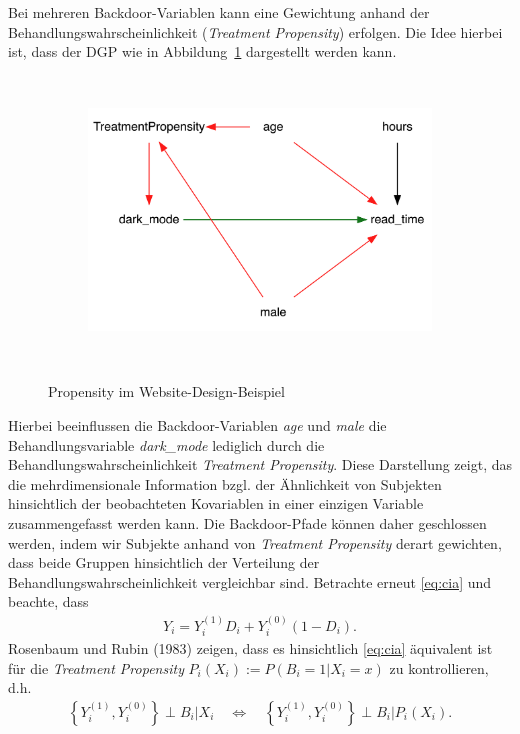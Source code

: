 \documentclass[
  a4paper,
  DIV=11,
  oneside]{scrreprt}
\begin{document}
Bei mehreren Backdoor-Variablen kann eine Gewichtung anhand der
Behandlungswahrscheinlichkeit (\emph{Treatment Propensity}) erfolgen.
Die Idee hierbei ist, dass der DGP wie in
Abbildung~\ref{fig-propCDdarkmode} dargestellt werden kann.

\begin{figure}

{\centering 

\begin{figure}[H]

{\centering \includegraphics[width=4in,height=3in]{Matching_files/figure-latex/dot-figure-2.png}

}

\end{figure}

}

\caption{\label{fig-propCDdarkmode}Propensity im
Website-Design-Beispiel}

\end{figure}

Hierbei beeinflussen die Backdoor-Variablen \emph{age} und \emph{male}
die Behandlungsvariable \emph{dark\_mode} lediglich durch die
Behandlungswahrscheinlichkeit \emph{Treatment Propensity}. Diese
Darstellung zeigt, das die mehrdimensionale Information bzgl. der
Ähnlichkeit von Subjekten hinsichtlich der beobachteten Kovariablen in
einer einzigen Variable zusammengefasst werden kann. Die Backdoor-Pfade
können daher geschlossen werden, indem wir Subjekte anhand von
\emph{Treatment Propensity} derart gewichten, dass beide Gruppen
hinsichtlich der Verteilung der Behandlungswahrscheinlichkeit
vergleichbar sind. Betrachte erneut \eqref{eq:cia} und beachte, dass
\begin{align}
  Y_i = Y_i^{(1)} D_i + Y_i^{(0)} (1-D_i).
\end{align} Rosenbaum und Rubin (1983) zeigen, dass es hinsichtlich
\eqref{eq:cia} äquivalent ist für die \emph{Treatment Propensity}
\(P_i(X_i):=P(B_i=1\vert X_i = x)\) zu kontrollieren, d.h. \begin{align}
  \left\{Y_i^{(1)},Y_i^{(0)}\right\} \perp B_i\vert X_i \quad\Leftrightarrow\quad \left\{Y_i^{(1)},Y_i^{(0)}\right\} \perp B_i\vert P_i(X_i).
\end{align}
\end{document}
